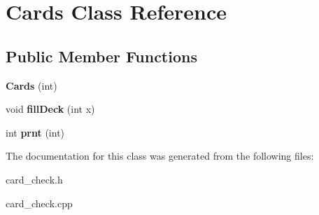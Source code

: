 \hypertarget{class_cards}{\section{Cards Class Reference}
\label{class_cards}
}
\subsection*{Public Member Functions}
\begin{DoxyCompactItemize}
\item 
\hypertarget{class_cards_a6edf386b9d83a2c693e4a5b9f0bebf0c}{{\bfseries Cards} (int)}\label{class_cards_a6edf386b9d83a2c693e4a5b9f0bebf0c}

\item 
\hypertarget{class_cards_a5172d2158510ffb70c5b17eafa1d8df7}{void {\bfseries fill\-Deck} (int x)}\label{class_cards_a5172d2158510ffb70c5b17eafa1d8df7}

\item 
\hypertarget{class_cards_a94335b21943e9f10b76b74bb7ac4a62a}{int {\bfseries prnt} (int)}\label{class_cards_a94335b21943e9f10b76b74bb7ac4a62a}

\end{DoxyCompactItemize}


The documentation for this class was generated from the following files\-:\begin{DoxyCompactItemize}
\item 
card\-\_\-check.\-h\item 
card\-\_\-check.\-cpp\end{DoxyCompactItemize}
